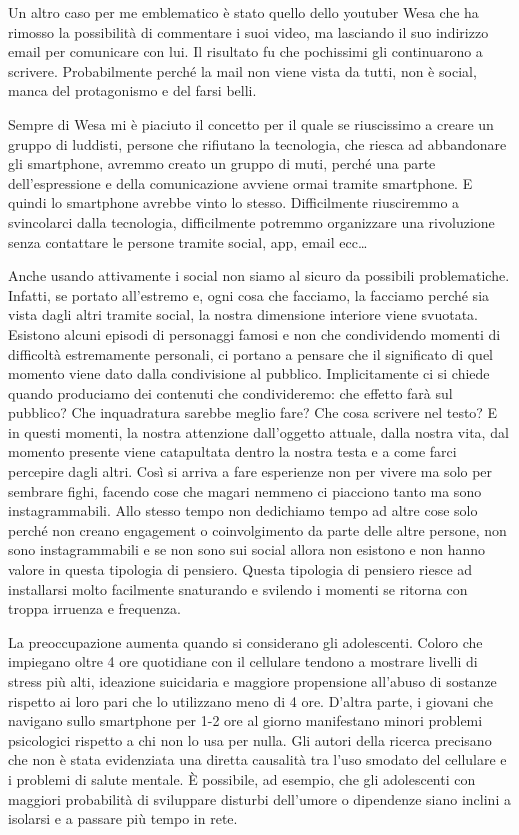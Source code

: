 \documentclass[12pt]{book} %
\begin{document}
\begin{mdframed}[linewidth=1pt]
Un altro caso per me emblematico è stato quello dello youtuber Wesa che ha rimosso la possibilità di commentare i suoi
video, ma lasciando il suo indirizzo email per comunicare con lui. Il risultato fu che pochissimi gli continuarono a
scrivere. Probabilmente perché la mail non viene vista da tutti, non è social, manca del protagonismo e del farsi
belli.

Sempre di Wesa mi è piaciuto il concetto per il quale se riuscissimo a creare un gruppo di luddisti, persone che rifiutano la tecnologia, che riesca ad abbandonare gli smartphone, avremmo creato un gruppo di muti, perché una parte dell'espressione e della comunicazione avviene ormai tramite smartphone. E quindi lo smartphone avrebbe vinto lo stesso. Difficilmente riusciremmo a svincolarci dalla tecnologia, difficilmente potremmo organizzare una rivoluzione senza contattare le persone tramite social, app, email ecc…

Anche usando attivamente i social non siamo al sicuro da possibili problematiche. Infatti, se portato all'estremo e, ogni cosa che facciamo, la facciamo perché sia vista dagli altri tramite social, la nostra dimensione interiore viene svuotata. Esistono alcuni episodi di personaggi famosi e non che condividendo momenti di difficoltà estremamente personali, ci portano a pensare che il significato di quel momento viene dato dalla condivisione al pubblico. Implicitamente ci si chiede quando produciamo dei contenuti che condivideremo: che effetto farà sul pubblico? Che inquadratura sarebbe meglio fare? Che cosa scrivere nel testo? E in questi momenti, la nostra attenzione dall'oggetto attuale, dalla nostra vita, dal momento presente viene catapultata dentro la nostra testa e a come farci percepire dagli altri. Così si arriva a fare esperienze non per vivere ma solo per sembrare fighi, facendo cose che magari nemmeno ci piacciono tanto ma sono instagrammabili. Allo stesso tempo non dedichiamo tempo ad altre cose solo perché non creano engagement o coinvolgimento da parte delle altre persone, non sono instagrammabili e se non sono sui social allora non esistono e non hanno valore in questa tipologia di pensiero. Questa tipologia di pensiero riesce ad installarsi molto facilmente snaturando e svilendo i momenti se ritorna con troppa irruenza e frequenza.

La preoccupazione aumenta quando si considerano gli adolescenti. Coloro che impiegano oltre 4 ore quotidiane con il cellulare tendono a mostrare livelli di stress più alti, ideazione suicidaria e maggiore propensione all'abuso di sostanze rispetto ai loro pari che lo utilizzano meno di 4 ore. D'altra parte, i giovani che navigano sullo smartphone per 1-2 ore al giorno manifestano minori problemi psicologici rispetto a chi non lo usa per nulla. Gli autori della ricerca precisano che non è stata evidenziata una diretta causalità tra l'uso smodato del cellulare e i problemi di salute mentale. È possibile, ad esempio, che gli adolescenti con maggiori probabilità di sviluppare disturbi dell'umore o dipendenze siano inclini a isolarsi e a passare più tempo in rete.


\end{mdframed}
\end{document}
